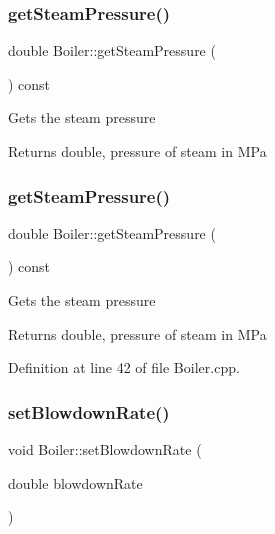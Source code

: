 \subsubsection{\texorpdfstring{get\+Steam\+Pressure()}{getSteamPressure()}\hspace{0.1cm}{\footnotesize\ttfamily [2/3]}}
{\footnotesize\ttfamily double Boiler\+::get\+Steam\+Pressure (\begin{DoxyParamCaption}{ }\end{DoxyParamCaption}) const}

Gets the steam pressure \begin{DoxyReturn}{Returns}
double, pressure of steam in M\+Pa 
\end{DoxyReturn}
\mbox{\label{class_boiler_a99d4bbace6ef20bcbdc4b0cfcdc43213}} 
\subsubsection{\texorpdfstring{get\+Steam\+Pressure()}{getSteamPressure()}\hspace{0.1cm}{\footnotesize\ttfamily [3/3]}}
{\footnotesize\ttfamily double Boiler\+::get\+Steam\+Pressure (\begin{DoxyParamCaption}{ }\end{DoxyParamCaption}) const}

Gets the steam pressure \begin{DoxyReturn}{Returns}
double, pressure of steam in M\+Pa 
\end{DoxyReturn}


Definition at line 42 of file Boiler.\+cpp.

\mbox{\label{class_boiler_a66c0e4c577dbd3f52dcf202e69a08371}} 
\subsubsection{\texorpdfstring{set\+Blowdown\+Rate()}{setBlowdownRate()}\hspace{0.1cm}{\footnotesize\ttfamily [1/3]}}
{\footnotesize\ttfamily void Boiler\+::set\+Blowdown\+Rate (\begin{DoxyParamCaption}\item[{double}]{blowdown\+Rate }\end{DoxyParamCaption})}

